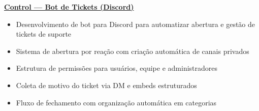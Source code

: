\documentclass[a4paper, 12pt]{article}
\newcommand{\resumeItemsSubSection}[1]{%
\vspace{-8pt}\small \begin{itemize}\setlength{\itemsep}{-0.3em}
#1
\end{itemize}
}
\newcommand{\resumeSkillSubsection}[1]{%
\noindent \textbf{#1}\\[-6pt]
}
\begin{document}
\resumeSkillSubsection{\href{https://github.com/nzlinaldi/control}{Control — Bot de Tickets (Discord)}}

\resumeItemsSubSection{
\item Desenvolvimento de bot para Discord para automatizar abertura e gestão de tickets de suporte
\item Sistema de abertura por reação com criação automática de canais privados
\item Estrutura de permissões para usuários, equipe e administradores
\item Coleta de motivo do ticket via DM e embeds estruturados
\item Fluxo de fechamento com organização automática em categorias
}
\end{document}
